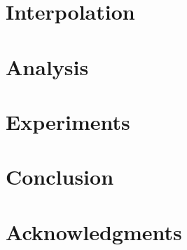 \documentclass[journal]{IEEEtran}
\begin{document}
  \section{Interpolation} 
  

  \section{Analysis} 
  

  \section{Experiments} 
  

  \section{Conclusion} 
  

  \section*{Acknowledgments}
  

  \linespread{0.91}
  \begingroup
    
    
  \endgroup
\end{document}
